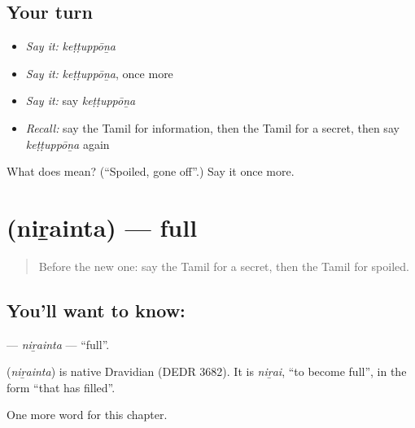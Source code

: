 \subsection*{Your turn}
\begin{itemize}
\raggedright
  \item \emph{Say it:} \emph{keṭṭuppōṉa}
  \item \emph{Say it:} \emph{keṭṭuppōṉa}, once more
  \item \emph{Say it:} say \emph{keṭṭuppōṉa}
  \item \emph{Recall:} say the Tamil for information, then the Tamil for a secret, then say \emph{keṭṭuppōṉa} again
\end{itemize}

\begin{tcolorbox}[breakable,colback=teal!4,colframe=teal!35!black,title={Before you move on}]
What does  mean? (\textquotedblleft{}Spoiled, gone off\textquotedblright{}.) Say it once more.
\end{tcolorbox}
\section[\texorpdfstring{\ta{நிறைந்த} (niṟainta)}{நிறைந்த (niṟainta)}]{ (niṟainta) — full}

\label{lesson:TA-C209-nirainta}



\begin{quote}
Before the new one: say the Tamil for a secret, then the Tamil for spoiled.
\end{quote}

\subsection*{You'll want to know: }
\textbf{} — \emph{niṟainta} — \textquotedblleft{}full\textquotedblright{}.

\begin{cousinweb}
\textbf{} (\emph{niṟainta}) is native Dravidian (DEDR 3682). It is \emph{niṟai}, \textquotedblleft{}to become full\textquotedblright{}, in the form \textquotedblleft{}that has filled\textquotedblright{}.
\end{cousinweb}

\begin{grammarlens}[title={What you've built}]
One more word for this chapter.
\end{grammarlens}

